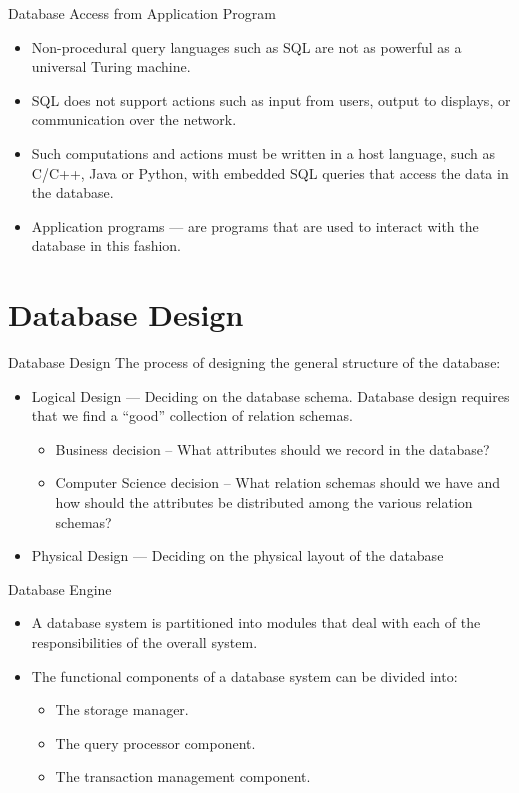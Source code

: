 \documentclass{beamer}
\begin{document}
\begin{frame}{Database Access from Application Program}
    \begin{itemize}
        \item Non-procedural query languages such as SQL are not as powerful as a universal Turing machine.    
        \item SQL does not support actions such as input from users, output to displays, or communication over the network.  
        \item Such computations and actions must be written in a host language, such as C/C++, Java or Python, with embedded SQL queries that access the data in the database.
        \item Application programs --- are programs that are used to interact with the database in this fashion.  
    \end{itemize}
\end{frame}

\section{Database Design}

\begin{frame}{Database Design}
The process of designing the general structure of the database:
    \begin{itemize}
        \item Logical Design --- Deciding on the database schema. Database design requires that we find a “good” collection of relation schemas.
        \begin{itemize}
            \item Business decision -- What attributes should we record in the database?
            \item Computer Science decision --  What relation schemas should we have and how should the attributes be distributed among the various relation schemas?
        \end{itemize}
        \item Physical Design --- Deciding on the physical layout of the database                
    \end{itemize}
\end{frame}

\begin{frame}{Database Engine}
    \begin{itemize}
        \item A database system is partitioned into modules that deal with each of the responsibilities of the overall system.  
        \item The functional components of a database system can be divided into:
        \begin{itemize}
            \item The storage manager.
            \item The  query processor component.
            \item The transaction management component.
        \end{itemize}
    \end{itemize}
\end{frame}
\end{document}
